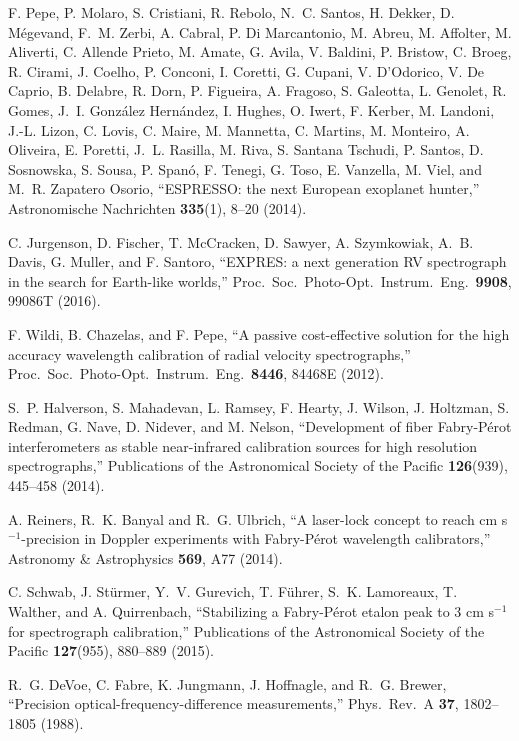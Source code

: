 \documentclass[10pt]{article}
\begin{document}
\begin{thebibliography}{21}
  F. Pepe, P. Molaro, S. Cristiani,
   R. Rebolo, N.~C. Santos, H. Dekker, D. M{\'e}gevand, F.~M. Zerbi, A. Cabral, P. Di Marcantonio, M. Abreu, M. Affolter, M. Aliverti, C. Allende Prieto, M. Amate, G. Avila, V. Baldini, P. Bristow, C. Broeg, R. Cirami, J. Coelho, P. Conconi, I. Coretti, G. Cupani, V. D'Odorico, V. De Caprio, B. Delabre, R. Dorn, P. Figueira, A. Fragoso, S. Galeotta, L. Genolet, R. Gomes, J.~I. Gonz{\'a}lez Hern{\'a}ndez, I. Hughes, O. Iwert, F. Kerber, M. Landoni, J.-L. Lizon, C. Lovis, C. Maire, M. Mannetta, C. Martins, M. Monteiro, A. Oliveira, E. Poretti, J.~L. Rasilla, M. Riva, S. Santana Tschudi, P. Santos, D. Sosnowska, S. Sousa, P. Span{\'o}, F. Tenegi, G. Toso, E. Vanzella, M. Viel, and M.~R. Zapatero Osorio, ``ESPRESSO: the next European exoplanet hunter,'' Astronomische Nachrichten {\bf 335}(1), 8--20 (2014).
 
  C. Jurgenson, D. Fischer, T. McCracken, D. Sawyer, A. Szymkowiak, A.~B. Davis, G. Muller, and F. Santoro, ``EXPRES: a next generation RV spectrograph in the search for Earth-like worlds,'' Proc.\ Soc.\ Photo-Opt.\ Instrum.\ Eng.\ {\bf 9908}, 99086T (2016).

  F. Wildi, B. Chazelas, and F. Pepe, ``A passive cost-effective solution for the high accuracy wavelength calibration of radial velocity spectrographs,'' Proc.\ Soc.\ Photo-Opt.\ Instrum.\ Eng.\ {\bf 8446}, 84468E (2012).
  
  S.~P. Halverson, S. Mahadevan, L. Ramsey, F. Hearty, J. Wilson, J. Holtzman, S. Redman, G. Nave, D. Nidever, and M. Nelson, ``Development of fiber Fabry-P{\'e}rot interferometers as stable near-infrared calibration sources for high resolution spectrographs,'' Publications of the Astronomical Society of the Pacific {\bf 126}(939), 445--458 (2014).  
 
   A. Reiners, R.~K. Banyal and R.~G. Ulbrich, ``A laser-lock concept to reach cm s$^{-1}$-precision in Doppler experiments with Fabry-P{\'e}rot wavelength calibrators,'' Astronomy \& Astrophysics {\bf 569}, A77 (2014).
   
  C. Schwab, J. St\"urmer, Y.~V. Gurevich,
   T. F\"uhrer, S.~K. Lamoreaux, T. Walther, and A. Quirrenbach, ``Stabilizing a Fabry-P{\'e}rot etalon peak to 3 cm s$^{-1}$ for spectrograph calibration,'' Publications of the Astronomical Society of the Pacific {\bf 127}(955), 880--889 (2015).
   
  R.~G. DeVoe, C. Fabre, K. Jungmann, J. Hoffnagle, and R.~G. Brewer, ``Precision optical-frequency-difference measurements,'' Phys.\ Rev.\ A {\bf 37}, 1802--1805 (1988).  
 

\end{thebibliography}
\end{document}
